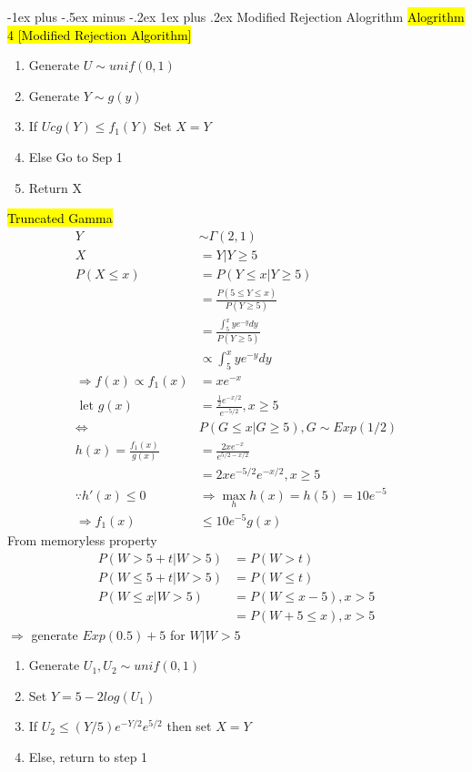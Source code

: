 \documentclass[a4paper,12pt,landscape]{article}
\makeatletter
\renewcommand{\subsubsection}{\@startsection{subsubsection}{3}{0mm}%
                                {-1ex plus -.5ex minus -.2ex}%
                                {1ex plus .2ex}%
                                {\normalfont\small\bfseries\color{violet}}}
\makeatother
\begin{document}
\begin{multicols}{3}
    \subsubsection{Modified Rejection Alogrithm}
    \hl{Alogrithm 4 [Modified Rejection Algorithm]}\\
    \begin{enumerate}
        \item Generate $U\sim unif(0,1)$
        \item Generate $Y\sim g(y)$
        \item If $Ucg(Y) \leq f_1(Y)$
            \subitem Set $X=Y$
        \item Else
            \subitem Go to Sep 1
        \item Return X
    \end{enumerate}

    \hl{Truncated Gamma}
    \begin{align*}
        Y &\sim \Gamma(2,1)\\
        X &=Y|Y\geq 5\\
        P(X\leq x) &= P(Y\leq x|Y\geq 5)\\
                   &=\frac{P(5\leq Y \leq x)}{P(Y \geq 5)}\\
                   &=\frac{\int_5^x ye^{-y}dy}{P(Y \geq 5)}\\
                   &\propto \int_5^x ye^{-y}dy\\
        \Rightarrow f(x) \propto f_1(x) &= xe^{-x}\\
        \text{ let } g(x) &= \frac{\frac{1}{2}e^{-x/2}}{e^{-5/2}}, x\geq 5\\
        \Leftrightarrow &P(G \leq x|G \geq 5), G\sim Exp(1/2)\\
        h(x) = \frac{f_1(x)}{g(x)} &=\frac{2xe^{-x}}{e^{5/2-x/2}}\\
                                   &=2xe^{-5/2}e^{-x/2}, x\geq 5\\
        \because h'(x) \leq 0 & \Rightarrow \max_h h(x) = h(5) = 10e^{-5}\\
        \Rightarrow f_1(x) &\leq 10e^{-5}g(x)
    \end{align*}
    From memoryless property
    \begin{align*}
        P(W > 5 + t | W > 5) &= P(W > t)\\
        P(W \leq 5 + t| W > 5) &= P(W \leq t)\\
        P(W \leq x| W> 5) &= P(W\leq x-5), x > 5\\
                          &=P(W + 5 \leq x), x > 5
    \end{align*}
    $\Rightarrow $ generate $Exp(0.5) + 5$ for $W | W > 5$
    \begin{enumerate}
        \item Generate $U_1, U_2 \sim unif(0,1)$
        \item Set $Y=5-2log(U_1)$
        \item If $U_2 \leq (Y/5)e^{-Y/2}e^{5/2}$ then set $X=Y$
        \item Else, return to step 1
    \end{enumerate}


\end{multicols}
\end{document}
